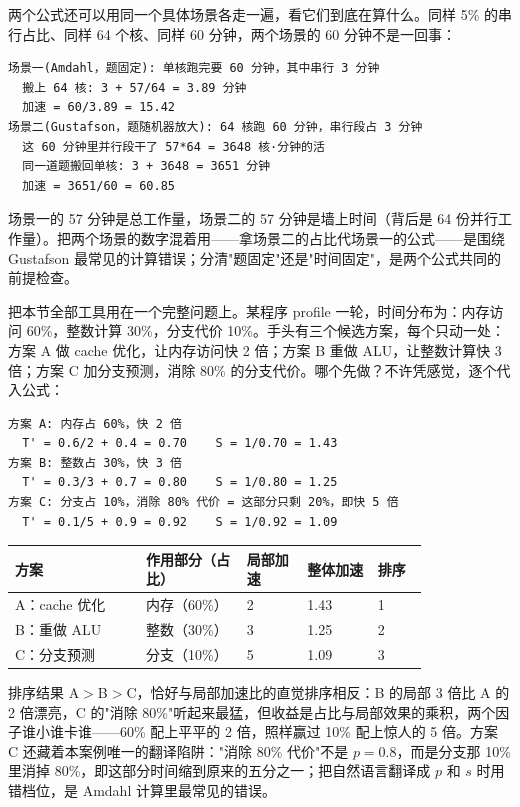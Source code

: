 两个公式还可以用同一个具体场景各走一遍，看它们到底在算什么。同样 5\% 的串行占比、同样 64 个核、同样 60 分钟，两个场景的 60 分钟不是一回事：

\begin{lstlisting}
场景一(Amdahl，题固定): 单核跑完要 60 分钟，其中串行 3 分钟
  搬上 64 核: 3 + 57/64 = 3.89 分钟
  加速 = 60/3.89 = 15.42
场景二(Gustafson，题随机器放大): 64 核跑 60 分钟，串行段占 3 分钟
  这 60 分钟里并行段干了 57*64 = 3648 核·分钟的活
  同一道题搬回单核: 3 + 3648 = 3651 分钟
  加速 = 3651/60 = 60.85
\end{lstlisting}

场景一的 57 分钟是总工作量，场景二的 57 分钟是墙上时间（背后是 64 份并行工作量）。把两个场景的数字混着用——拿场景二的占比代场景一的公式——是围绕 Gustafson 最常见的计算错误；分清"题固定"还是"时间固定"，是两个公式共同的前提检查。

把本节全部工具用在一个完整问题上。某程序 profile 一轮，时间分布为：内存访问 60\%，整数计算 30\%，分支代价 10\%。手头有三个候选方案，每个只动一处：方案 A 做 cache 优化，让内存访问快 2 倍；方案 B 重做 ALU，让整数计算快 3 倍；方案 C 加分支预测，消除 80\% 的分支代价。哪个先做？不许凭感觉，逐个代入公式：

\begin{lstlisting}
方案 A: 内存占 60%，快 2 倍
  T' = 0.6/2 + 0.4 = 0.70    S = 1/0.70 = 1.43
方案 B: 整数占 30%，快 3 倍
  T' = 0.3/3 + 0.7 = 0.80    S = 1/0.80 = 1.25
方案 C: 分支占 10%，消除 80% 代价 = 这部分只剩 20%，即快 5 倍
  T' = 0.1/5 + 0.9 = 0.92    S = 1/0.92 = 1.09
\end{lstlisting}

\begin{longtable}{L{0.26\linewidth}L{0.20\linewidth}L{0.12\linewidth}L{0.14\linewidth}L{0.10\linewidth}}
\toprule
方案 & 作用部分（占比） & 局部加速 & 整体加速 & 排序 \\
\midrule
A：cache 优化 & 内存（60\%） & 2 & 1.43 & 1 \\
B：重做 ALU & 整数（30\%） & 3 & 1.25 & 2 \\
C：分支预测 & 分支（10\%） & 5 & 1.09 & 3 \\
\bottomrule
\end{longtable}

排序结果 A$>$B$>$C，恰好与局部加速比的直觉排序相反：B 的局部 3 倍比 A 的 2 倍漂亮，C 的"消除 80\%"听起来最猛，但收益是占比与局部效果的乘积，两个因子谁小谁卡谁——60\% 配上平平的 2 倍，照样赢过 10\% 配上惊人的 5 倍。方案 C 还藏着本案例唯一的翻译陷阱："消除 80\% 代价"不是 $p=0.8$，而是分支那 10\% 里消掉 80\%，即这部分时间缩到原来的五分之一；把自然语言翻译成 $p$ 和 $s$ 时用错档位，是 Amdahl 计算里最常见的错误。

